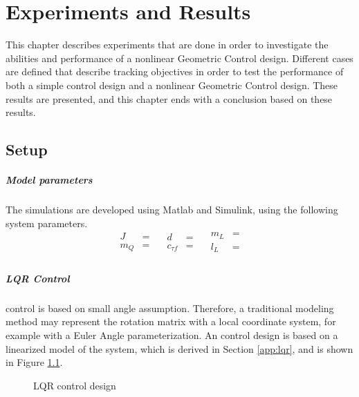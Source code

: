 \chapter{Experiments and Results}\label{ch:results}
This chapter describes experiments that are done in order to investigate the abilities and performance of a nonlinear Geometric Control design. 
Different cases are defined that describe tracking objectives in order to test the performance of both a simple  control design and a nonlinear Geometric Control design. These results are presented, and this chapter ends with a conclusion based on these results.

\section{Setup}
\paragraph{Model parameters}
The simulations are developed using Matlab and Simulink, using the following system parameters.
\begin{equation}\label{key}
\begin{aligned}
J&=\\
m_Q&=\\
\nonumber
\end{aligned}
\quad
\begin{aligned}
d&=\\
c_{\tau f}&=\\
\nonumber
\end{aligned}
\quad
\begin{aligned}
m_L&=\\
l_L&=\\
\nonumber
\end{aligned}
\end{equation}

\paragraph{LQR Control}
 control is based on small angle assumption. Therefore, a traditional modeling method may represent the rotation matrix with a local coordinate system, for example with a Euler Angle parameterization. An  control design is based on a linearized model of the system, which is derived in Section \ref{app:lqr}, and is shown in Figure \ref{fig:set.lqr}.
\begin{figure}[h!]
	\centering
	\caption{LQR control design\label{fig:set.lqr}}
\end{figure}		

